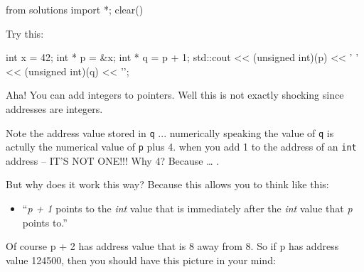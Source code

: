 \begin{python0}
from solutions import *; clear()
\end{python0}

Try this:

\begin{consolethree}[escapeinside=||]
int x = 42;
int * p = &x;
int * q = p + 1;
std::cout << (unsigned int)(p) << ' '
          << (unsigned int)(q) << '\n';
\end{consolethree}

Aha! You can add integers to pointers. Well this is not exactly shocking
since addresses are integers.

Note the address value stored in \texttt{q} ... numerically speaking the value of \texttt{q} is actully the numerical value of \texttt{p} plus 4. when you add 1 to the address of an \texttt{int} address -- IT'S NOT ONE!!! Why 4? Because \ldots{} .

But why does it work this way? Because this allows you to think like this:

\begin{itemize}
\item ``\textit{p + 1} points to the \textit{int} value that is immediately
  after the \textit{int} value that \textit{p} points to.''
\end{itemize}

Of course p + 2 has address value that is 8 away from 8. So if p has address value 124500, then you should have this picture in your mind:

